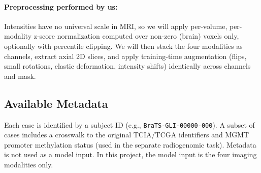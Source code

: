 \paragraph{Preprocessing performed by us:} Intensities have no universal scale in MRI, so we will apply per-volume, per-modality z-score normalization computed over non-zero (brain) voxels only, optionally with percentile clipping. We will then stack the four modalities as channels, extract axial 2D slices, and apply training-time augmentation (flips, small rotations, elastic deformation, intensity shifts) identically across channels and mask.

\subsection{Available Metadata}
Each case is identified by a subject ID (e.g., \texttt{BraTS-GLI-00000-000}). A subset of cases includes a crosswalk to the original TCIA/TCGA identifiers and MGMT promoter methylation status (used in the separate radiogenomic task). Metadata is not used as a model input. In this project, the model input is the four imaging modalities only.

